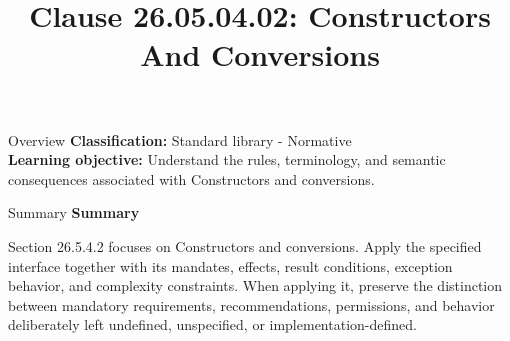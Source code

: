 \documentclass[10pt,letterpaper]{article}
\title{Clause 26.05.04.02: Constructors And Conversions}
\author{}
\date{}
\begin{document}
\maketitle
\begin{CornellOverviewBox}{Overview}
\textbf{Classification:} Standard library - Normative\\[2pt]
\textbf{Learning objective:} Understand the rules, terminology, and semantic consequences associated with Constructors and conversions.
\end{CornellOverviewBox}\begin{CornellSummaryBox}{Summary}
{\sffamily\bfseries\color{Accent} Summary}\par\vspace{3pt}Section 26.5.4.2 focuses on Constructors and conversions. Apply the specified interface together with its mandates, effects, result conditions, exception behavior, and complexity constraints. When applying it, preserve the distinction between mandatory requirements, recommendations, permissions, and behavior deliberately left undefined, unspecified, or implementation-defined.
\end{CornellSummaryBox}
\end{document}
